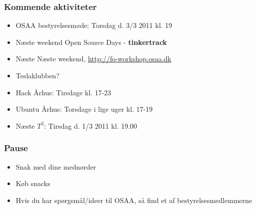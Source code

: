 \documentclass{beamer}
\begin{document}
\begin{frame}
  \frametitle{Kommende aktiviteter}
  \begin{itemize}
  \item OSAA bestyrelsesmøde: Torsdag d. 3/3 2011 kl. 19
  \item Næste weekend Open Source Days - \textbf{tinkertrack}
  \item Næste Næste weekend, \url{http://fo-workshop.osaa.dk}
  \item Teslaklubben?
  \item Hack Århus: Tirsdage kl. 17-23
  \item Ubuntu Århus: Torsdage i lige uger kl. 17-19
  \item Næste ${T^3}$: Tirsdag d. 1/3 2011 kl. 19.00
  \end{itemize}
\end{frame}

\begin{frame}
  \frametitle{Pause}
  \begin{itemize}
  \item Snak med dine mednørder
  \item Køb snacks
  \item Hvis du har spørgsmål/ideer til OSAA, så find et af bestyrelsesmedlemmerne
  \end{itemize}
\end{frame}




%

\end{document}
